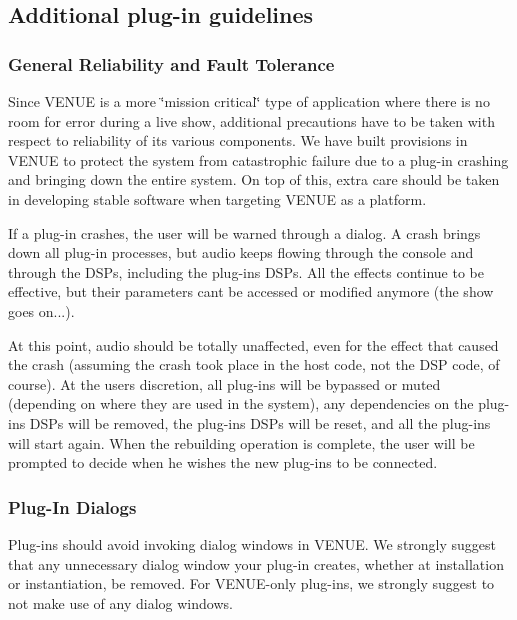 \hypertarget{a00849_aax_venue_guide__guidelines}{}\subsection{Additional plug-\/in guidelines}\label{a00849_aax_venue_guide__guidelines}
\hypertarget{a00849_subsection__aax_venue_guide__guidelines__reliability}{}\subsubsection{General Reliability and Fault Tolerance}\label{a00849_subsection__aax_venue_guide__guidelines__reliability}
 Since V\+E\+N\+UE is a more \char`\"{}mission critical\char`\"{} type of application where there is no room for error during a live show, additional precautions have to be taken with respect to reliability of its various components. We have built provisions in V\+E\+N\+UE to protect the system from catastrophic failure due to a plug-\/in crashing and bringing down the entire system. On top of this, extra care should be taken in developing stable software when targeting V\+E\+N\+UE as a platform.

 If a plug-\/in crashes, the user will be warned through a dialog. A crash brings down all plug-\/in processes, but audio keeps flowing through the console and through the D\+S\+Ps, including the plug-\/ins\textquotesingle{} D\+S\+Ps. All the effects continue to be effective, but their parameters can\textquotesingle{}t be accessed or modified anymore (the show goes on...).

 At this point, audio should be totally unaffected, even for the effect that caused the crash (assuming the crash took place in the host code, not the D\+SP code, of course). At the user\textquotesingle{}s discretion, all plug-\/ins will be bypassed or muted (depending on where they are used in the system), any dependencies on the plug-\/ ins\textquotesingle{} D\+S\+Ps will be removed, the plug-\/ins\textquotesingle{} D\+S\+Ps will be reset, and all the plug-\/ins will start again. When the rebuilding operation is complete, the user will be prompted to decide when he wishes the new plug-\/ins to be connected.

\hypertarget{a00849_subsection__aax_venue_guide__guidelines__dialogs}{}\subsubsection{Plug-\/\+In Dialogs}\label{a00849_subsection__aax_venue_guide__guidelines__dialogs}
 Plug-\/ins should avoid invoking dialog windows in V\+E\+N\+UE. We strongly suggest that any unnecessary dialog window your plug-\/in creates, whether at installation or instantiation, be removed. For V\+E\+N\+U\+E-\/only plug-\/ins, we strongly suggest to not make use of any dialog windows.

